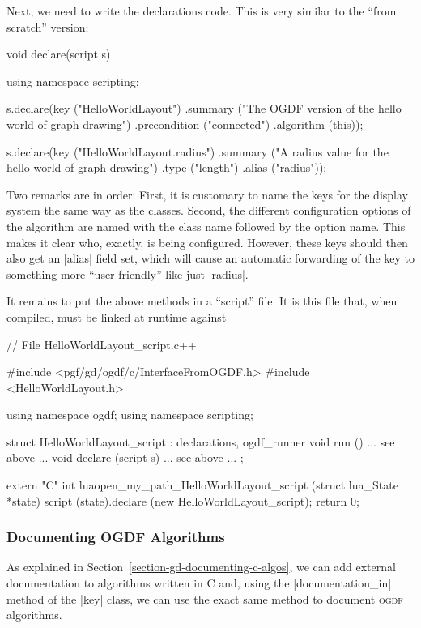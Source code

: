 Next, we need to write the declarations code. This is very similar to the
``from scratch'' version:
%
\begin{codeexample}[code only, tikz syntax=false]
void declare(script s) {
  using namespace scripting;

  s.declare(key ("HelloWorldLayout")
            .summary ("The OGDF version of the hello world of graph drawing")
            .precondition ("connected")
            .algorithm (this));

  s.declare(key ("HelloWorldLayout.radius")
            .summary ("A radius value for the hello world of graph drawing")
            .type ("length")
            .alias ("radius"));
}
\end{codeexample}

Two remarks are in order: First, it is customary to name the keys for the
display system the same way as the classes. Second, the different configuration
options of the algorithm are named with the class name followed by the option
name. This makes it clear who, exactly, is being configured. However, these
keys should then also get an |alias| field set, which will cause an automatic
forwarding of the key to something more ``user friendly'' like just |radius|.

It remains to put the above methods in a ``script'' file. It is this file that,
when compiled, must be linked at runtime against 
%
\begin{codeexample}[code only, tikz syntax=false]
// File HelloWorldLayout_script.c++

#include <pgf/gd/ogdf/c/InterfaceFromOGDF.h>
#include <HelloWorldLayout.h>

using namespace ogdf;
using namespace scripting;

struct HelloWorldLayout_script : declarations, ogdf_runner {
  void run ()             { ... see above ... }
  void declare (script s) { ... see above ... }
};

extern "C" int luaopen_my_path_HelloWorldLayout_script (struct lua_State *state) {
  script (state).declare (new HelloWorldLayout_script);
  return 0;
}
\end{codeexample}


\subsubsection{Documenting OGDF Algorithms}

As explained in Section~\ref{section-gd-documenting-c-algos}, we can add
external documentation to algorithms written in C and, using the
|documentation_in| method of the |key| class, we can use the exact same method
to document \textsc{ogdf} algorithms.

